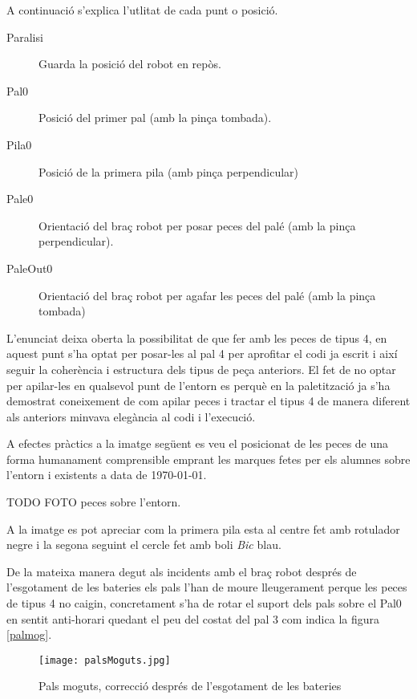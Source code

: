 A continuació s'explica l'utlitat de cada punt o posició.

\begin{description}
 \item [Paralisi] Guarda la posició del robot en repòs.
 \item [Pal0] Posició del primer pal (amb la pinça tombada).
 \item [Pila0] Posició de la primera pila (amb pinça perpendicular)
 \item [Pale0] Orientació del braç robot per posar peces del palé (amb la pinça
perpendicular).
 \item [PaleOut0] Orientació del braç robot per agafar les peces del palé
(amb la pinça tombada) 
\end{description}

L'enunciat deixa oberta la possibilitat de que fer amb les peces de
tipus 4, en aquest punt s'ha optat per posar-les al pal 4 per aprofitar el codi ja escrit i
així seguir la coherència i estructura dels tipus de peça anteriors. El fet de
no optar per apilar-les en qualsevol punt de l'entorn es perquè en la paletització
ja s'ha demostrat coneixement de com apilar peces i tractar el tipus 4 de manera
diferent als anteriors minvava elegància al codi i l'execució.

A efectes pràctics a la imatge següent es veu el posicionat de les peces de una forma
humanament comprensible emprant les marques fetes per els alumnes sobre l'entorn i existents
a data de \today. 

TODO FOTO peces sobre l'entorn.

A la imatge es pot apreciar com la primera pila esta al centre fet amb
rotulador negre i la segona seguint el cercle fet amb boli \emph{Bic} blau.

De la mateixa manera degut als incidents amb el braç robot després de l'esgotament de les
bateries els pals l'han de moure lleugerament perque les peces de tipus 4 no caigin, concretament
s'ha de rotar el suport dels pals sobre el Pal0 en sentit anti-horari quedant el peu del
costat del pal 3 com indica la figura \ref{palmog}.

\begin{figure}[H]
\begin{center}\label{fig:palmog}
 \texttt{[image: palsMoguts.jpg]}
\end{center}
  \caption{Pals moguts, correcció després de l'esgotament de les bateries}
\end{figure}

